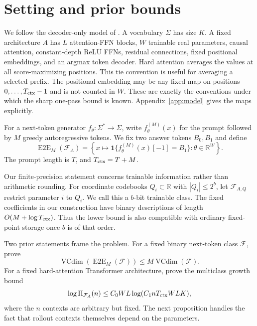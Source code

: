 \documentclass{article}
\newcommand{\R}{\mathbb R}
\newcommand{\1}{\mathbf 1}
\newcommand{\VC}{\operatorname{VCdim}}
\newcommand{\EtoE}{\operatorname{E2E}}
\begin{document}
\section{Setting and prior bounds}

We follow the decoder-only model of \citet{yang2026tight}. A vocabulary $\Sigma$ has size $K$. A fixed architecture $A$ has $L$ attention-FFN blocks, $W$ trainable real parameters, causal attention, constant-depth ReLU FFNs, residual connections, fixed positional embeddings, and an argmax token decoder. Hard attention averages the values at all score-maximizing positions. This tie convention is useful for averaging a selected prefix. The positional embedding may be any fixed map on positions $0,\ldots,T_{\rm ctx}-1$ and is not counted in $W$. These are exactly the conventions under which the sharp one-pass bound is known. Appendix~\ref{app:model} gives the maps explicitly.

For a next-token generator $f_\theta:\Sigma^*\to\Sigma$, write $f_\theta^{(M)}(x)$ for the prompt followed by $M$ greedy autoregressive tokens. We fix two answer tokens $B_0,B_1$ and define \[ \EtoE_M(\mathcal F_A) =\left\{x\mapsto \1\{f_\theta^{(M)}(x)[-1]=B_1\}:\theta\in\R^W\right\}. \] The prompt length is $T$, and $T_{\rm ctx}=T+M$.

Our finite-precision statement concerns trainable information rather than arithmetic rounding. For coordinate codebooks $Q_i\subset\R$ with $|Q_i|\leq2^b$, let $\mathcal F_{A,Q}$ restrict parameter $i$ to $Q_i$. We call this a $b$-bit trainable class. The fixed coefficients in our construction have binary descriptions of length $O(M+\log T_{\rm ctx})$. Thus the lower bound is also compatible with ordinary fixed-point storage once $b$ is of that order.

Two prior statements frame the problem. For a fixed binary next-token class $\mathcal F$, \citet{joshi2025theory} prove
\begin{equation}
 \VC(\EtoE_M(\mathcal F))\leq M\VC(\mathcal F).
 \label{eq:generic-upper}
\end{equation}
For a fixed hard-attention Transformer architecture, \citet{yang2026tight} prove the multiclass growth bound
\begin{equation}
 \log \Pi_{\mathcal F_A}(n)
 \leq C_0WL\log(C_1nT_{\rm ctx}WLK),
 \label{eq:yang-growth}
\end{equation}
where the $n$ contexts are arbitrary but fixed. The next proposition handles the fact that rollout contexts themselves depend on the parameters.
\end{document}
